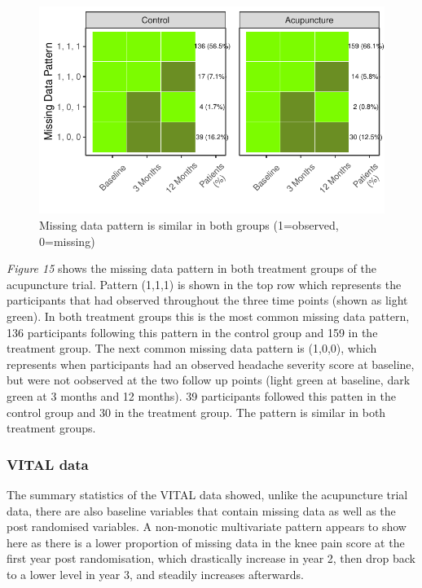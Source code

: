 \documentclass{article}
\newcommand{\pandocbounded}[1]{#1}
\begin{document}
\begin{figure}
\centering
\pandocbounded{\includegraphics[keepaspectratio]{Final_Report_files/figure-latex/unnamed-chunk-20-1.pdf}}
\caption{Missing data pattern is similar in both groups (1=observed,
0=missing)}
\end{figure}

\emph{Figure 15} shows the missing data pattern in both treatment groups
of the acupuncture trial. Pattern (1,1,1) is shown in the top row which
represents the participants that had observed throughout the three time
points (shown as light green). In both treatment groups this is the most
common missing data pattern, 136 participants following this pattern in
the control group and 159 in the treatment group. The next common
missing data pattern is (1,0,0), which represents when participants had
an observed headache severity score at baseline, but were not oobserved
at the two follow up points (light green at baseline, dark green at 3
months and 12 months). 39 participants followed this patten in the
control group and 30 in the treatment group. The pattern is similar in
both treatment groups.

\subsubsection{VITAL data}\label{vital-data-1}

The summary statistics of the VITAL data showed, unlike the acupuncture
trial data, there are also baseline variables that contain missing data
as well as the post randomised variables. A non-monotic multivariate
pattern appears to show here as there is a lower proportion of missing
data in the knee pain score at the first year post randomisation, which
drastically increase in year 2, then drop back to a lower level in year
3, and steadily increases afterwards.
\end{document}
